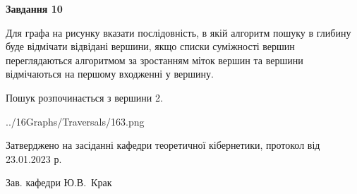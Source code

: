 \documentclass[12pt, ukrainian]{article}
\begin{document}
{\begin {large}
{\begin {center}\textbf{Завдання 10}\end {center}}\par
Для графа на рисунку вказати послідовність, в якій алгоритм пошуку в глибину буде відмічати відвідані вершини, якщо списки суміжності вершин переглядаються алгоритмом за зростанням міток вершин та вершини відмічаються на першому вход\-женні у вершину.\par
Пошук розпочинається з вершини 2.\par

\begin{center}
	{../16Graphs/Traversals/163.png}
\end{center}\par
\newpage


\end {large}
}
{\smallskip \begin {small} Затверджено на засіданні кафедри теоретичної кібернетики, протокол  від   23.01.2023 р.\par\smallskip\smallskip
{\parbox {6.5 cm}{Зав. кафедри \dotfill Ю.В.~Крак}} \end{small}}
\end{document}
